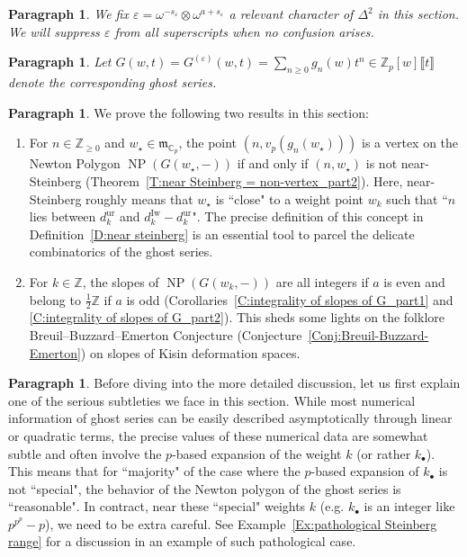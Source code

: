 \documentclass[12pt]{amsart}
\theoremstyle{definition}
\newtheorem{para}[subsection]{Paragraph}
\numberwithin{equation}{subsection}
\def\gothm{\mathfrak{m}}
\def\CC{\mathbb{C}}
\def\ZZ{\mathbb{Z}}
\DeclareMathOperator{\NP}{NP}
\newcommand{\Iw}{\mathrm{Iw}}
\newcommand{\unr}{\mathrm{ur}}
\begin{document}
\begin{para}
\label{P:para_150}
\emph{We fix  $\varepsilon = \omega^{-s_\varepsilon} \otimes \omega^{a+s_\varepsilon}$ a relevant character of $\Delta^2$ in this section. We will suppress $\varepsilon$ from all superscripts when no confusion arises.}
\end{para}

\begin{para}
\label{P:para_151}
\emph{Let $G(w,t) = G^{(\varepsilon)}(w,t) = \sum_{n\geq 0} g_n(w) t^n \in \ZZ_p[w]\llbracket t\rrbracket$ denote the corresponding ghost series.}
\end{para}

\medskip
\begin{para}
\label{P:para_152}
We prove the following two results in this section:
\begin{enumerate}
\item For $n \in \ZZ_{\geq 0}$ and $w_\star \in \gothm_{\CC_p}$, the point $(n, v_p(g_n(w_\star)))$ is a vertex on the Newton Polygon $\NP(G(w_\star, -))$ if and only if $(n, w_\star)$ is not near-Steinberg (Theorem~\ref{T:near Steinberg = non-vertex_part2}). Here, near-Steinberg roughly means that $w_\star$ is ``close" to a weight point $w_k$ such that ``$n$ lies between $d_k^\unr$ and $d_k^\Iw-d_k^\unr$".
The precise definition of this concept in Definition~\ref{D:near steinberg} is an essential tool to parcel the delicate combinatorics of the ghost series.

\item For $k \in \ZZ$, the slopes of $\NP(G(w_k,-))$ are all integers if $a$ is even and belong to $\frac 12\ZZ$ if $a$ is odd (Corollaries~\ref{C:integrality of slopes of G_part1} and \ref{C:integrality of slopes of G_part2}). This sheds some lights on the folklore Breuil--Buzzard--Emerton Conjecture (Conjecture~\ref{Conj:Breuil-Buzzard-Emerton}) on slopes of Kisin deformation spaces.
\end{enumerate}
\end{para}

\begin{para}
\label{P:para_153}
Before diving into the more detailed discussion, let us first explain one of the serious subtleties we face in this section.  While most numerical information of ghost series can be easily described asymptotically through linear or quadratic terms, the precise values of these numerical data are somewhat subtle and often involve the $p$-based expansion of the weight $k$ (or rather $k_\bullet$). This means that for ``majority" of the case where the $p$-based expansion of $k_\bullet$ is not ``special", the behavior of the Newton polygon of the ghost series is ``reasonable". In contract, near these ``special" weights $k$ (e.g. $k_\bullet$ is an integer like $p^{p^p}-p$), we need to be extra careful.  See Example~\ref{Ex:pathological Steinberg range} for a discussion in an example of such pathological case.
\end{para}
\end{document}
